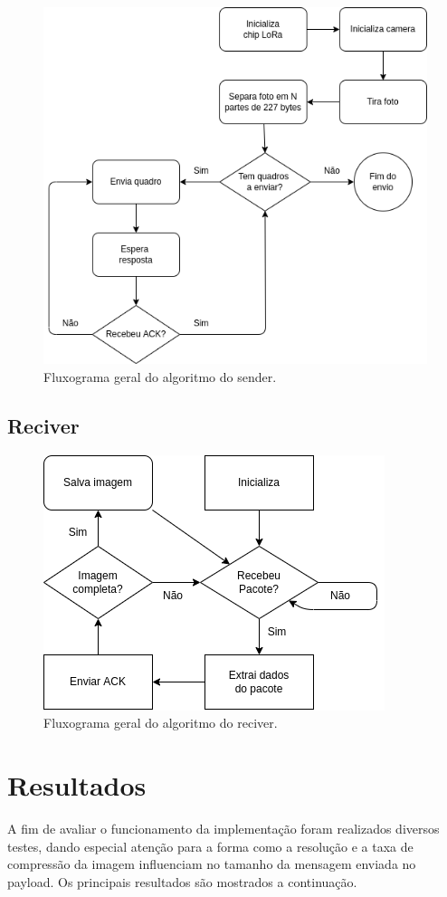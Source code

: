 \documentclass[
article,			%
12pt,				%
oneside,			%
a4paper,			%
english,			%
brazil,				%
sumario=tradicional
]{abntex2}
\begin{document}
\begin{figure}[!h]
  \caption{\label{fig:sender}Fluxograma geral do algoritmo do sender.}
  \centering
  \includegraphics[width=.7\textwidth]{fluxogram_sender}
\end{figure}

\subsection{Reciver}

\begin{figure}[!h]
  \caption{\label{fig:recivier}Fluxograma geral do algoritmo do reciver.}
  \centering
  \includegraphics[width=.7\textwidth]{fluxogram_recivier}
\end{figure}

\cleardoublepage

\section{Resultados}

A fim de avaliar o funcionamento da implementação foram realizados diversos testes, dando especial atenção para a forma como a resolução e a taxa de compressão da imagem influenciam no tamanho da mensagem enviada no payload. Os principais resultados são mostrados a continuação.
\end{document}
